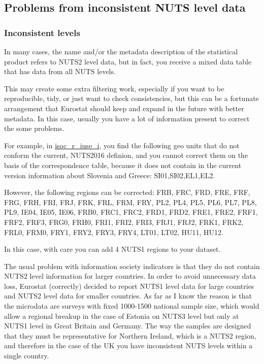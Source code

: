 \documentclass[]{article}
\begin{document}
\hypertarget{problems-from-inconsistent-nuts-level-data}{%
\subsection{Problems from inconsistent NUTS level
data}\label{problems-from-inconsistent-nuts-level-data}}

\hypertarget{inconsistent-levels}{%
\subsubsection{Inconsistent levels}\label{inconsistent-levels}}

In many cases, the name and/or the metadata description of the
statistical product refers to NUTS2 level data, but in fact, you receive
a mixed data table that has data from all NUTS levels.

This may create some extra filtering work, especially if you want to be
reproducible, tidy, or just want to check consistencies, but this can be
a fortunate arrangement that Eurostat should keep and expand in the
future with better metadata. In this case, usually you have a lot of
information present to correct the some problems.

For example, in
\href{https://appsso.eurostat.ec.europa.eu/nui/show.do?dataset=isoc_r_iuse_i\&lang=en}{isoc\_r\_iuse\_i},
you find the following geo units that do not conform the current,
NUTS2016 definion, and you cannot correct them on the basis of the
correspondence table, because it does not contain in the current version
information about Slovenia and Greece: SI01,SI02,EL1,EL2.

However, the following regions can be corrected: FRB, FRC, FRD, FRE,
FRF, FRG, FRH, FRI, FRJ, FRK, FRL, FRM, FRY, PL2, PL4, PL5, PL6, PL7,
PL8, PL9, IE04, IE05, IE06, FRB0, FRC1, FRC2, FRD1, FRD2, FRE1, FRE2,
FRF1, FRF2, FRF3, FRG0, FRH0, FRI1, FRI2, FRI3, FRJ1, FRJ2, FRK1, FRK2,
FRL0, FRM0, FRY1, FRY2, FRY3, FRY4, LT01, LT02, HU11, HU12.

In this case, with care you can add 4 NUTS1 regions to your dataset.

The usual problem with information society indicators is that they do
not contain NUTS2 level information for larger countries. In order to
avoid unnecessary data loss, Eurostat (correctly) decided to report
NUTS1 level data for large countries and NUTS2 level data for smaller
countries. As far as I know the reason is that the microdata are surveys
with fixed 1000-1500 national sample size, which would allow a regional
breakup in the case of Estonia on NUTS3 level but only at NUTS1 level in
Great Britain and Germany. The way the samples are designed that they
must be representative for Northern Ireland, which is a NUTS2 region,
and therefore in the case of the UK you have inconsistent NUTS levels
within a single country.
\end{document}

